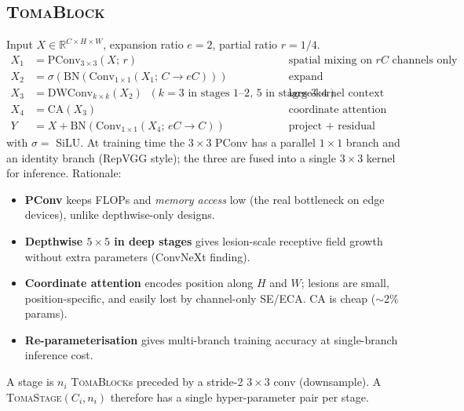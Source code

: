 \subsection{\textsc{TomaBlock}}
\label{sec:block}
Input $X\in\mathbb{R}^{C\times H\times W}$, expansion ratio $e{=}2$, partial ratio $r{=}1/4$.
\begin{align}
X_1 &= \mathrm{PConv}_{3\times3}(X;\, r) && \text{spatial mixing on $rC$ channels only (FasterNet)}\\
X_2 &= \sigma(\mathrm{BN}(\mathrm{Conv}_{1\times1}(X_1;\, C\!\to\! eC))) && \text{expand}\\
X_3 &= \mathrm{DWConv}_{k\times k}(X_2) \;\; (k{=}3 \text{ in stages 1--2},\, 5 \text{ in stages 3--4}) && \text{large-kernel context}\\
X_4 &= \mathrm{CA}(X_3) && \text{coordinate attention (H- and W-wise pooling)}\\
Y &= X + \mathrm{BN}(\mathrm{Conv}_{1\times1}(X_4;\, eC\!\to\! C)) && \text{project + residual}
\end{align}
with $\sigma=$ SiLU. At training time the $3\times3$ PConv has a parallel $1\times1$ branch and an identity branch (RepVGG style); the three are fused into a single $3\times3$ kernel for inference. Rationale:
\begin{itemize}
  \item \textbf{PConv} keeps FLOPs and \emph{memory access} low (the real bottleneck on edge devices), unlike depthwise-only designs.
  \item \textbf{Depthwise $5\times5$ in deep stages} gives lesion-scale receptive field growth without extra parameters (ConvNeXt finding).
  \item \textbf{Coordinate attention} encodes position along $H$ and $W$; lesions are small, position-specific, and easily lost by channel-only SE/ECA. CA is cheap ($\sim$2\% params).
  \item \textbf{Re-parameterisation} gives multi-branch training accuracy at single-branch inference cost.
\end{itemize}
A stage is $n_i$ \textsc{TomaBlock}s preceded by a stride-2 $3\times3$ conv (downsample). A \textsc{TomaStage}$(C_i, n_i)$ therefore has a single hyper-parameter pair per stage.

